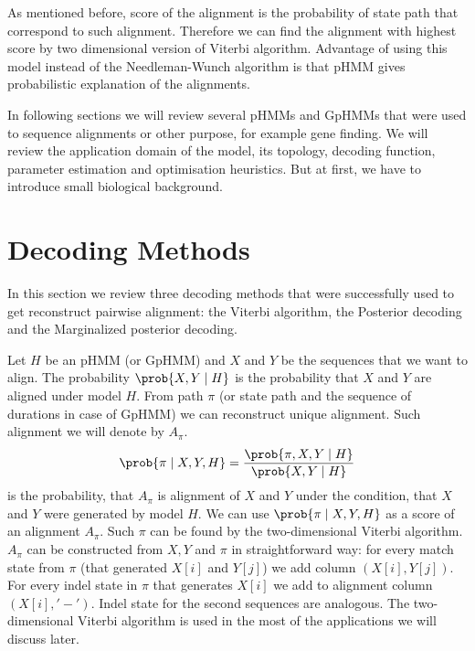 As mentioned before, score of the alignment is the probability of state path
that correspond to such alignment. Therefore we can find the alignment with
highest score by two dimensional version of Viterbi algorithm. Advantage of
using this model instead of the Needleman-Wunch algorithm is that pHMM gives
probabilistic explanation of the alignments. 

In following sections we will review several pHMMs and GpHMMs that were used to
sequence alignments or other purpose, for example gene finding. We will review
the application domain of the model, its topology, decoding function, parameter
estimation and optimisation heuristics. But at first, we have to introduce small
biological background.


\section{Decoding Methods}

In this section we review three decoding methods that were successfully used to
get reconstruct pairwise alignment: the Viterbi algorithm, the Posterior
decoding and the Marginalized posterior decoding.

Let $H$ be an pHMM (or GpHMM) and $X$ and $Y$ be the sequences that we want to
align. The probability $\prob{X,Y\mid H}$ is the probability that $X$ and $Y$
are aligned under model $H$.  From path $\pi$ (or state path and the
sequence of durations in case of GpHMM) we can reconstruct unique alignment.
Such alignment we will denote by $A_{\pi}$.
  \[\prob{\pi\mid
X,Y,H}=\frac{\prob{\pi,X,Y\mid H}}{\prob{X,Y\mid H}}\] is the probability, that
$A_{\pi}$ is alignment of $X$ and $Y$ under the condition, that $X$ and $Y$ were
generated by model $H$.  We can use $\prob{\pi\mid X,Y,H}$ as a score of an
alignment $A_{\pi}$. Such $\pi$ can be found by the two-dimensional Viterbi
algorithm. $A_{\pi}$ can be constructed from $X,Y$ and $\pi$ in straightforward
way: for every match state from $\pi$ (that generated $X[i]$ and $Y[j]$) we add
column $(X[i],Y[j])$. For every indel state in $\pi$ that generates $X[i]$ we
add to alignment column $(X[i],'-')$. Indel state for the second sequences are
analogous.  The two-dimensional Viterbi algorithm is used in the most of the
applications we will discuss later.

